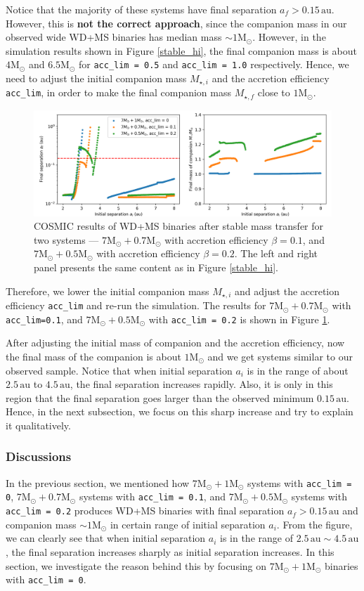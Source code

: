 \documentclass[12pt]{article}
\newcommand{\Msun}{\mathrm{M_{\odot}}}
\newcommand{\au}{\, \mathrm{au}}
\begin{document}
Notice that the majority of these systems have final separation $a_f > 0.15 \au$. However, this is \textbf{not the correct approach}, since the companion mass in our observed wide WD+MS binaries has median mass $\sim 1\Msun$. However, in the simulation results shown in Figure \ref{stable_hi}, the final companion mass is about $4 \Msun$ and $6.5\Msun$ for \verb|acc_lim = 0.5| and \verb|acc_lim = 1.0| respectively. Hence, we need to adjust the  initial companion mass $M_{\star, i}$ and the accretion efficiency \verb|acc_lim|, in order to make the final companion mass $M_{\star, f}$ close to $1\Msun$.

\begin{figure}
    \centering
    \includegraphics[width = 0.75\linewidth]{fig/stable7+1ex.png}
    \caption{COSMIC results of WD+MS binaries after stable mass transfer for two systems — $7\Msun + 0.7\Msun$ with accretion efficiency $\beta = 0.1$, and $7\Msun + 0.5\Msun$ with accretion efficiency $\beta = 0.2$. The left and right panel presents the same content as in Figure \ref{stable_hi}.}
    \label{stable_hi_ex}
\end{figure}

Therefore, we lower the initial companion mass $M_{\star, i}$ and adjust the accretion efficiency \verb|acc_lim| and re-run the simulation. The results for $7\Msun + 0.7\Msun$ with \verb|acc_lim=0.1|, and $7\Msun + 0.5\Msun$ with \verb|acc_lim = 0.2| is shown in Figure \ref{stable_hi_ex}.

After adjusting the initial mass of companion and the accretion efficiency, now the final mass of the companion is about $1\Msun$ and we get systems similar to our observed sample. Notice that when initial separation $a_i$ is in the range of about $2.5 \au$ to $4.5 \au$, the final separation increases rapidly. Also, it is only in this region that the final separation goes larger than the observed minimum $0.15 \au$. Hence, in the next subsection, we focus on this sharp increase and try to explain it qualitatively.

\subsubsection{Discussions}
In the previous section, we mentioned how $7\Msun + 1 \Msun$ systems with \verb|acc_lim = 0|, $7 \Msun + 0.7\Msun$ systems with \verb|acc_lim = 0.1|, and $7 \Msun + 0.5 \Msun$ systems with \verb|acc_lim = 0.2| produces WD+MS binaries with final separation $a_f > 0.15 \au$ and companion mass $\sim 1 \Msun$ in certain range of initial separation $a_i$. From the figure, we can clearly see that when initial separation $a_i$ is in the range of $2.5 \au \sim 4.5\au$, the final separation increases sharply as initial separation increases. In this section, we investigate the reason behind this by focusing on $7\Msun + 1\Msun$ binaries with \verb|acc_lim = 0|.
\end{document}
